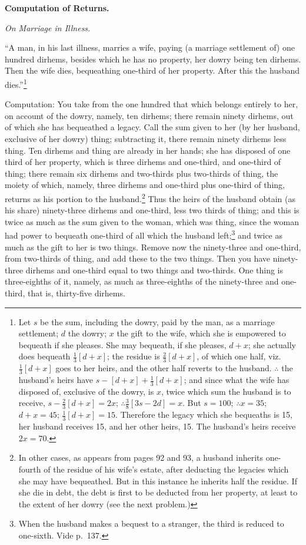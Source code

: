 \vspace{0.3cm}
\noindent\textbf{Computation of Returns.}

\textit{On Marriage in Illness.}

``A man, in his last illness, marries a wife, paying (a marriage settlement of) one hundred dirhems, besides which he has no property, her dowry being ten dirhems. Then the wife dies, bequeathing one-third of her property. After this the husband dies.''\footnote{Let $s$ be the sum, including the dowry, paid by the man, as a marriage settlement; $d$ the dowry; $x$ the gift to the wife, which she is empowered to bequeath if she pleases. She may bequeath, if she pleases, $d+x$; she actually does bequeath $\frac{1}{3}[d+x]$; the residue is $\frac{2}{3}[d+x]$, of which one half, viz.~$\frac{1}{3}[d+x]$ goes to her heirs, and the other half reverts to the husband. $\therefore$ the husband's heirs have $s - [d+x] + \frac{1}{3}[d+x]$; and since what the wife has disposed of, exclusive of the dowry, is $x$, twice which sum the husband is to receive, $s - \frac{2}{3}[d+x] = 2x$; $\therefore \frac{3}{8}[3s - 2d] = x$. But $s = 100$; $\therefore x = 35$; $d+x = 45$; $\frac{1}{3}[d+x] = 15$. Therefore the legacy which she bequeaths is 15, her husband receives 15, and her other heirs, 15. The husband's heirs receive $2x = 70$.}

Computation: You take from the one hundred that which belongs entirely to her, on account of the dowry, namely, ten dirhems; there remain ninety dirhems, out of which she has bequeathed a legacy. Call the sum given to her (by her husband, exclusive of her dowry) thing; subtracting it, there remain ninety dirhems less thing. Ten dirhems and thing are already in her hands; she has disposed of one third of her property, which is three dirhems and one-third, and one-third of thing; there remain six dirhems and two-thirds plus two-thirds of thing, the moiety of which, namely, three dirhems and one-third plus one-third of thing, returns as his portion to the husband.\footnote{In other cases, as appears from pages 92 and 93, a husband inherits one-fourth of the residue of his wife's estate, after deducting the legacies which she may have bequeathed. But in this instance he inherits half the residue. If she die in debt, the debt is first to be deducted from her property, at least to the extent of her dowry (see the next problem.)} Thus the heirs of the husband obtain (as his share) ninety-three dirhems and one-third, less two thirds of thing; and this is twice as much as the sum given to the woman, which was thing, since the woman had power to bequeath one-third of all which the husband left;\footnote{When the husband makes a bequest to a stranger, the third is reduced to one-sixth. Vide p.~137.} and twice as much as the gift to her is two things. Remove now the ninety-three and one-third, from two-thirds of thing, and add these to the two things. Then you have ninety-three dirhems and one-third equal to two things and two-thirds. One thing is three-eighths of it, namely, as much as three-eighths of the ninety-three and one-third, that is, thirty-five dirhems.

